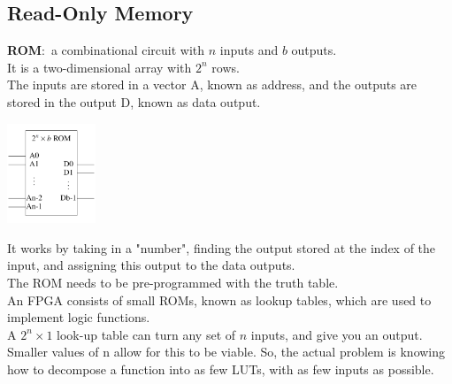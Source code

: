 \documentclass[nobib]{tufte-handout}
\newcommand{\defn}[2]{\noindent\textbf{#1}:\ #2}
\begin{document}
    \subsection{Read-Only Memory}
    \defn{ROM}{a combinational circuit with $n$ inputs and $b$ outputs}.\\
    It is a two-dimensional array with $2^n$ rows.\\
    The inputs are stored in a vector A, known as address, and the outputs are stored in the output D, known as data output.\\
    \begin{center}
        \includegraphics[width = 100px]{images/combinational_representation.png}
    \end{center}
    It works by taking in a "number", finding the output stored at the index of the input, and assigning this output to the data outputs.\\
    The ROM needs to be pre-programmed with the truth table.\\
    An FPGA consists of small ROMs, known as lookup tables, which are used to implement logic functions.\\
    A $2^n\times 1$ look-up table can turn any set of $n$ inputs, and give you an output. Smaller values of n allow for this to be viable. So, the actual problem is knowing how to decompose a function into as few LUTs, with as few inputs as possible.\\
\end{document}
